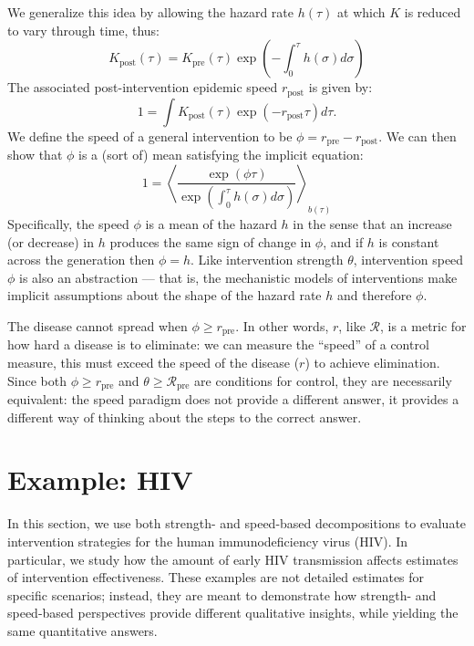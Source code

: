 \documentclass[12pt]{article}
\newcommand{\RR}{\ensuremath{{\mathcal R}}}
\newcommand{\Rx}[1]{\ensuremath{\RR_{\mathrm{#1}}}}
\newcommand{\Rpre}{\Rx{pre}}
\newcommand{\KK}{\ensuremath{{K}}}
\newcommand{\Kx}[1]{\ensuremath{\KK_{\mathrm{#1}}}}
\newcommand{\Kpre}{\Kx{pre}}
\newcommand{\Kpost}{\Kx{post}}
\newcommand{\rr}{\ensuremath{{r}}}
\newcommand{\rx}[1]{\ensuremath{\rr_{\mathrm{#1}}}}
\newcommand{\rpre}{\rx{pre}}
\newcommand{\rpost}{\rx{post}}
\newcommand{\eqlab}[1]{\label{eq:#1}}
\begin{document}
We generalize this idea by allowing the hazard rate $h(\tau)$ at which $K$ is reduced to vary through time, thus:
\begin{equation}
	\Kpost(\tau) = \Kpre(\tau) \exp\left(-\int_0^\tau h(\sigma) d\sigma\right)
\end{equation}
The associated post-intervention epidemic speed $\rpost$ is given by:
\begin{equation}
	1 = \int \Kpost(\tau) \exp(-\rpost \tau) d\tau.	
\end{equation}
We define the speed of a general intervention to be $\phi = \rpre - \rpost$.
We can then show that $\phi$ is a (sort of) mean satisfying the implicit equation:
\begin{equation}
	1 = \left\langle \frac{\exp(\phi \tau) }{\exp\left(\int_0^\tau h(\sigma) d\sigma\right)} \right\rangle_{b(\tau)}
	\eqlab{speedMean}
\end{equation}
Specifically, the speed $\phi$ is a mean of the hazard $h$ in the sense that an increase (or decrease) in $h$ produces the same sign of change in $\phi$, and if $h$ is constant across the generation then $\phi=h$.
Like intervention strength $\theta$, intervention speed $\phi$ is also an abstraction --- that is, the mechanistic models of interventions make implicit assumptions about the shape of the hazard rate $h$ and therefore $\phi$.

The disease cannot spread when $\phi \geq \rpre$. In other words, \rr, like \RR, is a metric for how hard a disease is to eliminate: we can measure the ``speed'' of a control measure, this must exceed the speed of the disease (\rr) to achieve elimination. Since both $\phi \geq \rpre$ and $\theta \geq \Rpre$ are conditions for control, they are necessarily equivalent: the speed paradigm does not provide a different answer, it provides a different way of thinking about the steps to the correct answer.

\section{Example: HIV}

In this section, we use both strength- and speed-based decompositions to evaluate intervention strategies for the human immunodeficiency virus (HIV). 
In particular, we study how the amount of early HIV transmission affects estimates of intervention effectiveness. 
These examples are not detailed estimates for specific scenarios; 
instead, they are meant to demonstrate how strength- and speed-based perspectives provide different qualitative insights, while yielding the same quantitative answers.
\end{document}
